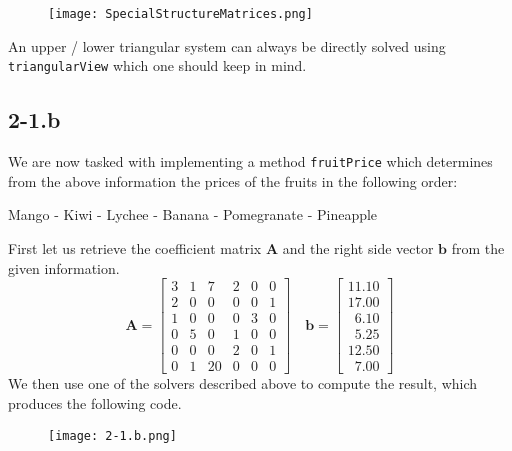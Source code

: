\documentclass{article}
\begin{document}
\begin{figure}[!hbt]
    \centering
\texttt{[image: SpecialStructureMatrices.png]}
\end{figure}
An upper / lower triangular system can always be directly solved using \verb|triangularView| which one should keep in mind. 

\pagebreak

\subsection*{2-1.b}
We are now tasked with implementing a method \verb|fruitPrice| which determines from the above information the prices of the fruits in the following order:
\begin{center}
    Mango - Kiwi - Lychee - Banana - Pomegranate - Pineapple
\end{center}
First let us retrieve the coefficient matrix $\mathbf{A}$ and the right side vector $\mathbf{b}$ from the given information.
\begin{equation*}
\mathbf{A} = 
    \begin{bmatrix}
        3 & 1 & 7 & 2 & 0 & 0 \\
        2 & 0 & 0 & 0 & 0 & 1 \\
        1 & 0 & 0 & 0 & 3 & 0 \\
        0 & 5 & 0 & 1 & 0 & 0 \\
        0 & 0 & 0 & 2 & 0 & 1 \\
        0 & 1 & 20 & 0 & 0 & 0
    \end{bmatrix} \quad \mathbf{b} = \begin{bmatrix}
        11.10 \\
        17.00 \\
        \phantom{0}6.10 \\
         \phantom{0}5.25 \\
        12.50 \\
         \phantom{0}7.00
    \end{bmatrix}
\end{equation*}
We then use one of the solvers described above to compute the result, which produces the following code.
\begin{figure}[!hbt]
    \centering
\texttt{[image: 2-1.b.png]}
\end{figure}
\end{document}

